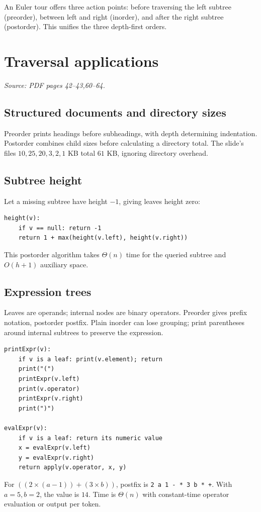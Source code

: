 \documentclass[11pt,letterpaper]{article}
\newcommand{\sourcepages}[1]{\textit{Source: PDF pages #1.}}
\newcommand{\method}[1]{\texttt{#1}}
\begin{document}
An Euler tour offers three action points: before traversing the left subtree (preorder), between left and right (inorder), and after the right subtree (postorder). This unifies the three depth-first orders.

\section{Traversal applications}
\sourcepages{42--43,60--64}
\subsection{Structured documents and directory sizes}
Preorder prints headings before subheadings, with depth determining indentation. Postorder combines child sizes before calculating a directory total. The slide's files $10,25,20,3,2,1$ KB total $61$ KB, ignoring directory overhead.

\subsection{Subtree height}
Let a missing subtree have height $-1$, giving leaves height zero:
\par\noindent\begin{minipage}{\linewidth}
\begin{lstlisting}
height(v):
    if v == null: return -1
    return 1 + max(height(v.left), height(v.right))
\end{lstlisting}
\end{minipage}\par
This postorder algorithm takes $\Theta(n)$ time for the queried subtree and $O(h+1)$ auxiliary space.

\subsection{Expression trees}
Leaves are operands; internal nodes are binary operators. Preorder gives prefix notation, postorder postfix. Plain inorder can lose grouping; print parentheses around internal subtrees to preserve the expression.
\par\noindent\begin{minipage}{\linewidth}
\begin{lstlisting}
printExpr(v):
    if v is a leaf: print(v.element); return
    print("(")
    printExpr(v.left)
    print(v.operator)
    printExpr(v.right)
    print(")")

evalExpr(v):
    if v is a leaf: return its numeric value
    x = evalExpr(v.left)
    y = evalExpr(v.right)
    return apply(v.operator, x, y)
\end{lstlisting}
\end{minipage}\par
For $((2\times(a-1))+(3\times b))$, postfix is \method{2 a 1 - * 3 b * +}. With $a=5,b=2$, the value is $14$. Time is $\Theta(n)$ with constant-time operator evaluation or output per token.
\end{document}
